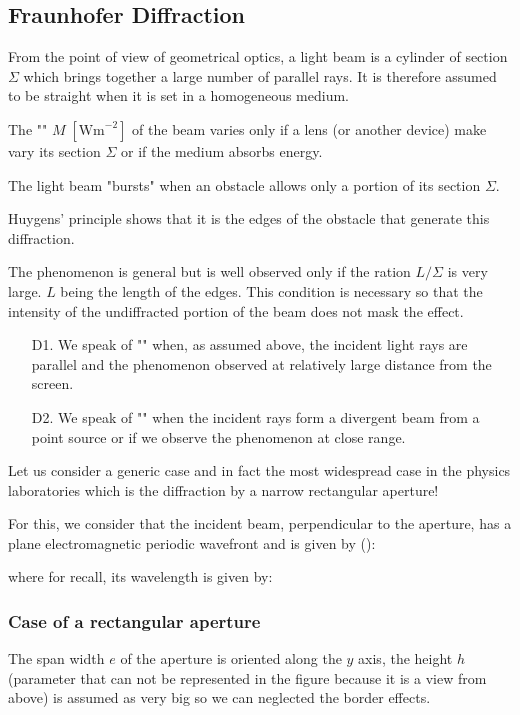 	\pagebreak
	\subsection{Fraunhofer Diffraction}\label{fraunhofer diffraction}
	From the point of view of geometrical optics, a light beam is a cylinder of section $\Sigma$ which brings together a large number of parallel rays. It is therefore assumed to be straight when it is set in a homogeneous medium.
	
	The "" $M \; [\text{Wm}^{-2}]$ of the beam varies only if a lens (or another device) make vary its section $\Sigma$ or if the medium absorbs energy.
	
	The light beam "bursts" when an obstacle allows only a portion of its section $\Sigma$.
	
	Huygens' principle shows that it is the edges of the obstacle that generate this diffraction.
	
	The phenomenon is general but is well observed only if the ration $L/\Sigma$ is very large. $L$ being the length of the edges. This condition is necessary so that the intensity of the undiffracted portion of the beam does not mask the effect.
	
	\begin{enumerate}
		\item[D1.] We speak of "" when, as assumed above, the incident light rays are parallel and the phenomenon observed at relatively large distance from the screen.

		\item[D2.] We speak of "" when the incident rays form a divergent beam from a point source or if we observe the phenomenon at close range.
	\end{enumerate}
	
	Let us consider a generic case and in fact the most widespread case in the physics laboratories which is the diffraction by a narrow rectangular aperture!
	
	For this, we consider that the incident beam, perpendicular to the aperture, has a plane electromagnetic periodic wavefront and is given by ():
	
	where for recall, its wavelength is given by:
	
	
	\subsubsection{Case of a rectangular aperture}
	The span width $e$ of the aperture is oriented along the $y$ axis, the height $h$ (parameter that can not be represented in the figure because it is a view from above) is assumed as very big so we can neglected the border effects.

